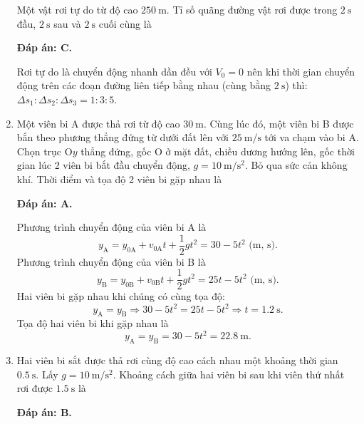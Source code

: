 \begin{enumerate}[label=\bfseries Câu \arabic*:]
	\cauhoi
	{Một vật rơi tự do từ độ cao $250\ \text{m}$. Tỉ số quãng đường vật rơi được trong $2\ \text{s}$ đầu, $2\ \text{s}$ sau và $2\ \text{s}$ cuối cùng là
	}
	\loigiai
	{\textbf{Đáp án: C.}
		
		Rơi tự do là chuyển động nhanh dần đều với $V_0=0$  nên khi thời gian chuyển động trên các đoạn đường liên tiếp bằng nhau (cùng bằng $2\ \text{s}$) thì: $\Delta s_1:\Delta s_2:\Delta s_3=1:3:5$.
		
		
	}
	\item {}
	
	\cauhoi
	{Một viên bi A được thả rơi từ độ cao $\SI{30}{\meter}$. Cùng lúc đó, một viên bi B được bắn theo phương thẳng đứng từ dưới đất lên với $\SI{25}{\meter/\second}$ tới va chạm vào bi A. Chọn trục O$y$ thẳng đứng, gốc O ở mặt đất, chiều dương hướng lên, gốc thời gian lúc 2 viên bi bắt đầu chuyển động, $g=\SI{10}{\meter/\second^2}$. Bỏ qua sức cản không khí. Thời điểm và tọa độ 2 viên bi gặp nhau là
	}
	\loigiai
	{\textbf{Đáp án: A.}
		
		Phương trình chuyển động của viên bi A là
		$$y_{\text{A}}=y_{0\text{A}}+v_{0\text{A}}t+\dfrac{1}{2}gt^2=30-5t^2 \textrm{ (m, s)}.$$
		Phương trình chuyển động của viên bi B là
		$$y_{\text{B}}=y_{0\text{B}}+v_{0\text{B}}t+\dfrac{1}{2}gt^2=25t-5t^2\textrm{ (m, s)}.$$
		Hai viên bi gặp nhau khi chúng có cùng tọa độ:
		$$y_{\text{A}}=y_{\text{B}}\Rightarrow 30-5t^2=25t-5t^2 \Rightarrow t=\SI{1.2}{\second}.$$
		Tọa độ hai viên bi khi gặp nhau là
		$$y_{\text{A}}=y_{\text{B}}=30-5t^2=\SI{22.8}{\meter}.$$
		
		
	}
	\item {}
	
	\cauhoi
	{Hai viên bi sắt được thả rơi cùng độ cao cách nhau một khoảng thời gian $\SI{0,5}{\second}$. Lấy $g = \SI{10}{\meter/\second^2}$. Khoảng cách giữa hai viên bi sau khi viên thứ nhất rơi được $\SI{1,5}{\second}$ là
	}
	\loigiai
	{\textbf{Đáp án: B.}
		
}
\end{enumerate}

